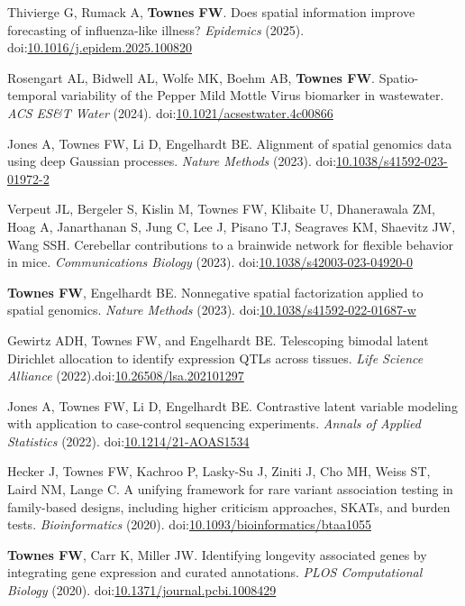 \documentclass[10pt]{article}
\newcommand\doilink[1]{\href{https://dx.doi.org/#1}{#1}}
\newcommand\doi[1]{doi:\doilink{#1}}
\begin{document}
\begin{enumerate}[label= {[\arabic*]}]
\item Thivierge G, Rumack A, {\bf Townes FW}. Does spatial information improve forecasting of influenza-like illness? {\it Epidemics} (2025). \doi{10.1016/j.epidem.2025.100820}
\item Rosengart AL, Bidwell AL, Wolfe MK, Boehm AB, {\bf Townes FW}. Spatio-temporal variability of the Pepper Mild Mottle Virus biomarker in wastewater. {\it ACS ES\&T Water} (2024). \doi{10.1021/acsestwater.4c00866}
\item Jones A, Townes FW, Li D, Engelhardt BE. Alignment of spatial genomics data using deep Gaussian processes. {\it Nature Methods} (2023). \doi{10.1038/s41592-023-01972-2}
\item Verpeut JL, Bergeler S, Kislin M, Townes FW, Klibaite U, Dhanerawala ZM, Hoag A, Janarthanan S, Jung C, Lee J, Pisano TJ, Seagraves KM, Shaevitz JW, Wang SSH. Cerebellar contributions to a brainwide network for flexible behavior in mice. {\it Communications Biology} (2023). \doi{10.1038/s42003-023-04920-0}
\item {\bf Townes FW}, Engelhardt BE. Nonnegative spatial factorization applied to spatial genomics. {\it Nature Methods} (2023). \doi{10.1038/s41592-022-01687-w}
\item Gewirtz ADH, Townes FW, and Engelhardt BE. Telescoping bimodal latent Dirichlet allocation to identify expression QTLs across tissues. {\it Life Science Alliance} (2022).\newline \doi{10.26508/lsa.202101297}
\item Jones A, Townes FW, Li D, Engelhardt BE. Contrastive latent variable modeling with application to case-control sequencing experiments. {\it Annals of Applied Statistics} (2022). \newline \doi{10.1214/21-AOAS1534}
\item Hecker J, Townes FW, Kachroo P, Lasky-Su J, Ziniti J, Cho MH, Weiss ST, Laird NM, Lange C. A unifying framework for rare variant association testing in family-based designs, including higher criticism approaches, SKATs, and burden tests. {\it Bioinformatics} (2020). \newline \doi{10.1093/bioinformatics/btaa1055}
\item {\bf Townes FW}, Carr K, Miller JW. Identifying longevity associated genes by integrating gene expression and curated annotations. {\it PLOS Computational Biology} (2020). \newline \doi{10.1371/journal.pcbi.1008429}

\end{enumerate}
\end{document}
